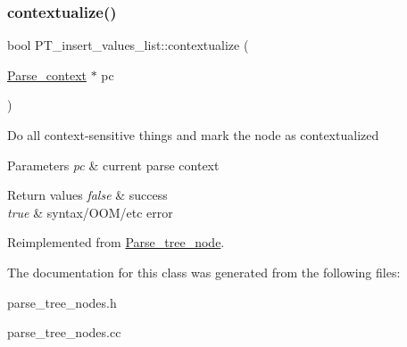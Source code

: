 \subsubsection{\texorpdfstring{contextualize()}{contextualize()}}
{\footnotesize\ttfamily bool P\+T\+\_\+insert\+\_\+values\+\_\+list\+::contextualize (\begin{DoxyParamCaption}\item[{\mbox{\hyperlink{structParse__context}{Parse\+\_\+context}} $\ast$}]{pc }\end{DoxyParamCaption})\hspace{0.3cm}{\ttfamily [virtual]}}

Do all context-\/sensitive things and mark the node as contextualized


\begin{DoxyParams}{Parameters}
{\em pc} & current parse context\\
\hline
\end{DoxyParams}

\begin{DoxyRetVals}{Return values}
{\em false} & success \\
\hline
{\em true} & syntax/\+O\+O\+M/etc error \\
\hline
\end{DoxyRetVals}


Reimplemented from \mbox{\hyperlink{classParse__tree__node_a22d93524a537d0df652d7efa144f23da}{Parse\+\_\+tree\+\_\+node}}.



The documentation for this class was generated from the following files\+:\begin{DoxyCompactItemize}
\item 
parse\+\_\+tree\+\_\+nodes.\+h\item 
parse\+\_\+tree\+\_\+nodes.\+cc\end{DoxyCompactItemize}
